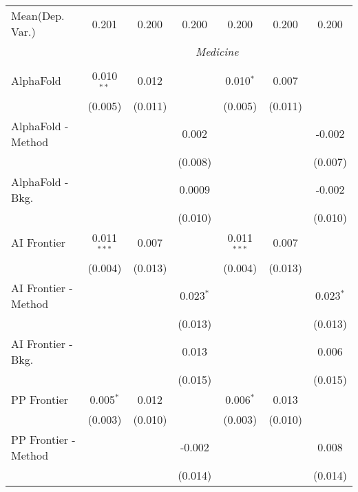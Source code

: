 \begin{tabular}{lcccccc}
Mean(Dep. Var.) & 0.201 & 0.200 & 0.200 & 0.200 & 0.200 & 0.200 \\
 & \multicolumn{6}{c}{\textit{Medicine}} \\ \\
   AlphaFold            & 0.010$^{**}$  & 0.012         &             & 0.010$^{*}$   & 0.007         &   \\   
                        & (0.005)       & (0.011)       &             & (0.005)       & (0.011)       &   \\   
   AlphaFold - Method   &               &               & 0.002       &               &               & -0.002\\   
                        &               &               & (0.008)     &               &               & (0.007)\\   
   AlphaFold - Bkg.     &               &               & 0.0009      &               &               & -0.002\\   
                        &               &               & (0.010)     &               &               & (0.010)\\   
   AI Frontier          & 0.011$^{***}$ & 0.007         &             & 0.011$^{***}$ & 0.007         &   \\   
                        & (0.004)       & (0.013)       &             & (0.004)       & (0.013)       &   \\   
   AI Frontier - Method &               &               & 0.023$^{*}$ &               &               & 0.023$^{*}$\\   
                        &               &               & (0.013)     &               &               & (0.013)\\   
   AI Frontier - Bkg.   &               &               & 0.013       &               &               & 0.006\\   
                        &               &               & (0.015)     &               &               & (0.015)\\   
   PP Frontier          & 0.005$^{*}$   & 0.012         &             & 0.006$^{*}$   & 0.013         &   \\   
                        & (0.003)       & (0.010)       &             & (0.003)       & (0.010)       &   \\   
   PP Frontier - Method &               &               & -0.002      &               &               & 0.008\\   
                        &               &               & (0.014)     &               &               & (0.014)\\   

\end{tabular}
